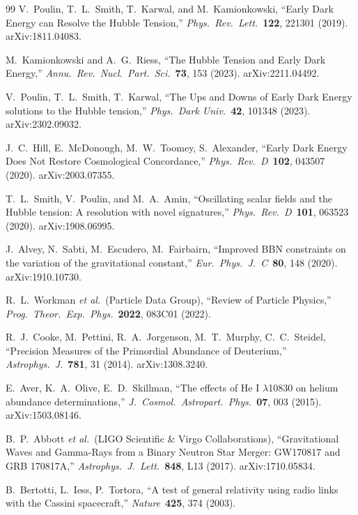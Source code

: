 \documentclass[11pt,a4paper]{article}
\theoremstyle{definition}
\begin{document}
\begin{thebibliography}{99}
V.~Poulin, T.~L.~Smith, T.~Karwal, and M.~Kamionkowski, ``Early Dark Energy can Resolve the Hubble Tension,'' \emph{Phys.\ Rev.\ Lett.}\ \textbf{122}, 221301 (2019). arXiv:1811.04083.

M.~Kamionkowski and A.~G.~Riess, ``The Hubble Tension and Early Dark Energy,'' \emph{Annu.\ Rev.\ Nucl.\ Part.\ Sci.}\ \textbf{73}, 153 (2023). arXiv:2211.04492.

V.~Poulin, T.~L.~Smith, T.~Karwal, ``The Ups and Downs of Early Dark Energy solutions to the Hubble tension,'' \emph{Phys.\ Dark Univ.}\ \textbf{42}, 101348 (2023). arXiv:2302.09032.

J.~C.~Hill, E.~McDonough, M.~W.~Toomey, S.~Alexander, ``Early Dark Energy Does Not Restore Cosmological Concordance,'' \emph{Phys.\ Rev.\ D}\ \textbf{102}, 043507 (2020). arXiv:2003.07355.

T.~L.~Smith, V.~Poulin, and M.~A.~Amin, ``Oscillating scalar fields and the Hubble tension: A resolution with novel signatures,'' \emph{Phys.\ Rev.\ D}\ \textbf{101}, 063523 (2020). arXiv:1908.06995.

J.~Alvey, N.~Sabti, M.~Escudero, M.~Fairbairn, ``Improved BBN constraints on the variation of the gravitational constant,'' \emph{Eur.\ Phys.\ J.\ C}\ \textbf{80}, 148 (2020). arXiv:1910.10730.

R.~L.~Workman \emph{et al.}\ (Particle Data Group), ``Review of Particle Physics,'' \emph{Prog.\ Theor.\ Exp.\ Phys.}\ \textbf{2022}, 083C01 (2022).

R.~J.~Cooke, M.~Pettini, R.~A.~Jorgenson, M.~T.~Murphy, C.~C.~Steidel, ``Precision Measures of the Primordial Abundance of Deuterium,'' \emph{Astrophys.\ J.}\ \textbf{781}, 31 (2014). arXiv:1308.3240.

E.~Aver, K.~A.~Olive, E.~D.~Skillman, ``The effects of He I $\lambda$10830 on helium abundance determinations,'' \emph{J.\ Cosmol.\ Astropart.\ Phys.}\ \textbf{07}, 003 (2015). arXiv:1503.08146.

B.~P.~Abbott \emph{et al.}\ (LIGO Scientific \& Virgo Collaborations), ``Gravitational Waves and Gamma-Rays from a Binary Neutron Star Merger: GW170817 and GRB 170817A,'' \emph{Astrophys.\ J.\ Lett.}\ \textbf{848}, L13 (2017). arXiv:1710.05834.

B.~Bertotti, L.~Iess, P.~Tortora, ``A test of general relativity using radio links with the Cassini spacecraft,'' \emph{Nature}\ \textbf{425}, 374 (2003).


\end{thebibliography}
\end{document}
